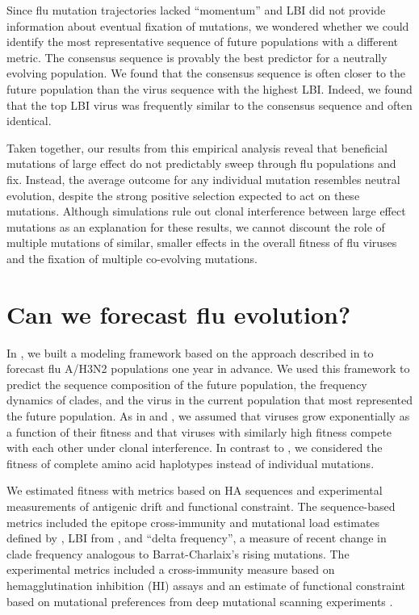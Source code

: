 Since flu mutation trajectories lacked ``momentum'' and LBI did not provide information about eventual fixation of mutations, we wondered whether we could identify the most representative sequence of future populations with a different metric.
The consensus sequence is provably the best predictor for a neutrally evolving population.
We found that the consensus sequence is often closer to the future population than the virus sequence with the highest LBI.
Indeed, we found that the top LBI virus was frequently similar to the consensus sequence and often identical.

Taken together, our results from this empirical analysis reveal that beneficial mutations of large effect do not predictably sweep through flu populations and fix.
Instead, the average outcome for any individual mutation resembles neutral evolution, despite the strong positive selection expected to act on these mutations.
Although simulations rule out clonal interference between large effect mutations as an explanation for these results, we cannot discount the role of multiple mutations of similar, smaller effects in the overall fitness of flu viruses and the fixation of multiple co-evolving mutations.

\section{Can we forecast flu evolution?}

In \citet{Huddleston2020}, we built a modeling framework based on the approach described in \citet{Luksza:2014hj} to forecast flu A/H3N2 populations one year in advance.
We used this framework to predict the sequence composition of the future population, the frequency dynamics of clades, and the virus in the current population that most represented the future population.
As in \citet{Barrat-Charlaix2020} and \citet{Luksza:2014hj}, we assumed that viruses grow exponentially as a function of their fitness and that viruses with similarly high fitness compete with each other under clonal interference.
In contrast to \citet{Barrat-Charlaix2020}, we considered the fitness of complete amino acid haplotypes instead of individual mutations.

We estimated fitness with metrics based on HA sequences and experimental measurements of antigenic drift and functional constraint.
The sequence-based metrics included the epitope cross-immunity and mutational load estimates defined by \citet{Luksza:2014hj}, LBI from \citet{Neher:2014eu}, and ``delta frequency'', a measure of recent change in clade frequency analogous to Barrat-Charlaix's rising mutations.
The experimental metrics included a cross-immunity measure based on hemagglutination inhibition (HI) assays \citep{Neher:2016hy} and an estimate of functional constraint based on mutational preferences from deep mutational scanning experiments \citep{Lee2018}.

